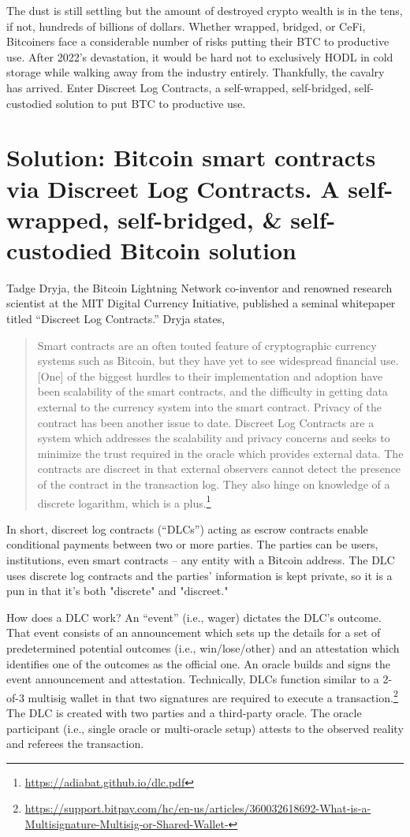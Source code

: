 \documentclass[twoside, a4paper, 11pt]{article}
\begin{document}
  The dust is still settling but the amount of destroyed crypto wealth is in the tens, if not, hundreds of billions of dollars. Whether wrapped, bridged, or CeFi, Bitcoiners face a considerable number of risks putting their BTC to productive use. After 2022’s devastation, it would be hard not to exclusively HODL in cold storage while walking away from the industry entirely. Thankfully, the cavalry has arrived. Enter Discreet Log Contracts, a self-wrapped, self-bridged, self-custodied solution to put BTC to productive use.

  \section{Solution: Bitcoin smart contracts via Discreet Log Contracts. A self-wrapped, self-bridged, \& self-custodied Bitcoin solution}

  Tadge Dryja, the Bitcoin Lightning Network co-inventor and renowned research scientist at the MIT Digital Currency Initiative, published a seminal whitepaper titled “Discreet Log Contracts.” Dryja states,
  \begin{quote}
    Smart contracts are an often touted feature of cryptographic currency
    systems such as Bitcoin, but they have yet to see widespread financial use.
    [One] of the biggest hurdles to their implementation and adoption have been
    scalability of the smart contracts, and the difficulty in getting data external
    to the currency system into the smart contract. Privacy of the contract has
    been another issue to date. Discreet Log Contracts are a system which
    addresses the scalability and privacy concerns and seeks to minimize the
    trust required in the oracle which provides external data. The contracts are
    discreet in that external observers cannot detect the presence of the contract
    in the transaction log. They also hinge on knowledge of a discrete logarithm,
    which is a plus.\footnote{\url{https://adiabat.github.io/dlc.pdf}}
  \end{quote}

  In short, discreet log contracts (“DLCs”) acting as escrow contracts enable conditional payments between two or more parties. The parties can be users, institutions, even smart contracts – any entity with a Bitcoin address. The DLC uses discrete log contracts and the parties’ information is kept private, so it is a pun in that it's both "discrete" and "discreet."

  How does a DLC work? An “event” (i.e., wager) dictates the DLC’s outcome. That event consists of an announcement which sets up the details for a set of predetermined potential outcomes (i.e., win/lose/other) and an attestation which identifies one of the outcomes as the official one. An oracle builds and signs the event announcement and attestation. Technically, DLCs function similar to a 2-of-3 multisig wallet in that two signatures are required to execute a transaction.\footnote{\url{https://support.bitpay.com/hc/en-us/articles/360032618692-What-is-a-Multisignature-Multisig-or-Shared-Wallet-}} The DLC is created with two parties and a third-party oracle. The oracle participant (i.e., single oracle or multi-oracle setup) attests to the observed reality and referees the transaction.
\end{document}
